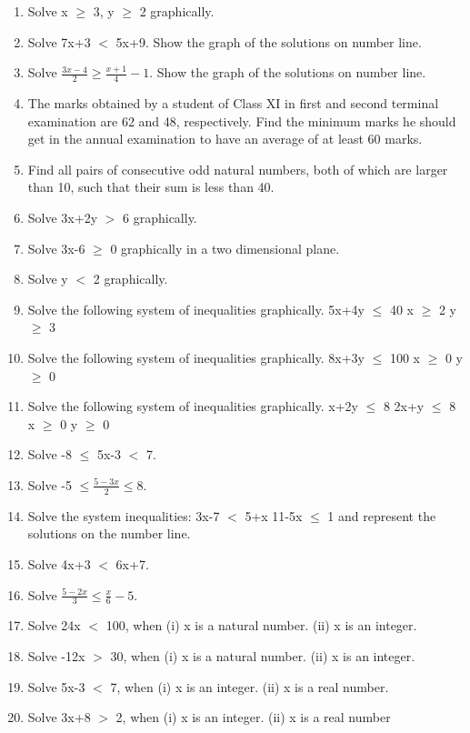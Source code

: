 \renewcommand{\theequation}{\theenumi}
\begin{enumerate}[label=\arabic*.,ref=\thesubsection.\theenumi]

\item Solve  x $\geq$ 3, y $\geq$ 2 graphically.
    \item Solve 7x+3 $<$ 5x+9. Show the graph of the solutions on number line.
    \item Solve $\frac{3x-4}{2} \geq \frac{x+1}{4}-1$. Show the graph of the solutions on number line.
    \item The marks obtained by a student of Class XI in first and second terminal examination are 62 and 48, respectively. Find the minimum marks he should get in the annual examination to have an average of at least 60 marks.
    \item Find all pairs of consecutive odd natural numbers, both of which are larger than 10, such that their sum is less than 40.
    \item Solve 3x+2y $>$ 6 graphically.
    \item Solve 3x-6 $\geq$ 0 graphically in a two dimensional plane.
    \item Solve y $<$ 2 graphically.
    \item Solve the following system of inequalities graphically.
     5x+4y $\leq$ 40
     x $\geq$ 2
     y $\geq$ 3
     \item Solve the following system of inequalities graphically.
     8x+3y $\leq$ 100
     x $\geq$ 0
     y $\geq$ 0
     \item Solve the following system of inequalities graphically.
     x+2y $\leq$ 8
     2x+y $\leq$ 8
     x $\geq$ 0
     y $\geq$ 0
     \item Solve -8 $\leq$ 5x-3 $<$ 7.
     \item Solve -5 $\leq \frac{5-3x}{2} \leq 8$.
     \item Solve the system inequalities:
     3x-7 $<$ 5+x
     11-5x $\leq$ 1
     and represent the solutions on the number line.
    
    \item Solve 4x+3 $<$ 6x+7.
    \item Solve $\frac{5-2x}{3} \leq \frac{x}{6}-5$.

	\item Solve 24x $<$ 100, when
	(i) x is a natural number.
	(ii) x is an integer.
	\item Solve -12x $>$ 30, when
	(i) x is a natural number.
	(ii) x is an integer.
	\item Solve 5x-3 $<$ 7, when
	(i) x is an integer.
	(ii) x is a real number.
	\item Solve 3x+8 $>$ 2, when
	(i) x is an integer.
	(ii) x is a real number
	

\end{enumerate}
